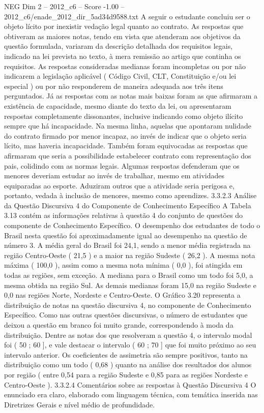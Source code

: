 \begin{textsample}{NEG Dim 2 – 2012\_c6 – Score -1.00 – 2012\_c6/enade\_2012\_dir\_5ad34d9588.txt}
A seguir o estudante concluiu ser o objeto lícito por inexistir vedação legal quanto ao contrato.
As respostas que obtiveram as maiores notas, tendo em vista que atenderam aos objetivos da questão formulada, variaram da descrição detalhada dos requisitos legais, indicado na lei prevista no texto, à mera remissão ao artigo que continha os requisitos.
As respostas consideradas medianas foram incompletas ou por não indicarem a legislação aplicável ( Código Civil, CLT, Constituição e/ou lei especial ) ou por não responderem de maneira adequada aos três itens perguntados.
Já as respostas com as notas mais baixas foram as que afirmaram a existência de capacidade, mesmo diante do texto da lei, ou apresentaram respostas completamente dissonantes, inclusive indicando como objeto ilícito sempre que há incapacidade.
Na mesma linha, aquelas que apontaram nulidade do contrato firmado por menor incapaz, ao invés de indicar que o objeto seria lícito, mas haveria incapacidade.
Também foram equivocadas as respostas que afirmaram que seria a possibilidade estabelecer contrato com representação dos pais, colidindo com as normas legais.
Algumas respostas defenderam que os menores deveriam estudar ao invés de trabalhar, mesmo em atividades equiparadas ao esporte.
Aduziram outros que a atividade seria perigosa e, portanto, vedada à inclusão de menores, mesmo como aprendizes. 3.3.2.3 Análise da Questão Discursiva 4 do Componente de Conhecimento Específico A Tabela 3.13 contém as informações relativas à questão 4 do conjunto de questões do componente de Conhecimento Específico.
O desempenho dos estudantes de todo o Brasil nesta questão foi aproximadamente igual ao desempenho na questão de número 3.
A média geral do Brasil foi 24,1, sendo a menor média registrada na região Centro-Oeste ( 21,5 ) e a maior na região Sudeste ( 26,2 ).
A mesma nota máxima ( 100,0 ), assim como a mesma nota mínima ( 0,0 ), foi atingida em todas as regiões, sem exceção.
A mediana para o Brasil como um todo foi 5,0, a mesma obtida na região Sul.
As demais medianas foram 15,0 na região Sudeste e 0,0 nas regiões Norte, Nordeste e Centro-Oeste.
O Gráfico 3.20 representa a distribuição de notas na questão discursiva 4, no componente de Conhecimento Específico.
Como nas outras questões discursivas, o número de estudantes que deixou a questão em branco foi muito grande, correspondendo à moda da distribuição.
Dentre as notas dos que resolveram a questão 4, o intervalo modal foi ( 50 ; 60 ], e vale destacar o intervalo ( 60 ; 70 ] que foi muito próximo ao seu intervalo anterior.
Os coeficientes de assimetria são sempre positivos, tanto na distribuição como um todo ( 0,68 ) quanto na análise dos resultados dos alunos por região ( entre 0,54 para a região Sudeste e 0,85 para as regiões Nordeste e Centro-Oeste ). 3.3.2.4 Comentários sobre as respostas à Questão Discursiva 4 O enunciado era claro, elaborado com linguagem técnica, com temática inserida nas Diretrizes Gerais e nível médio de profundidade.

\end{textsample}
